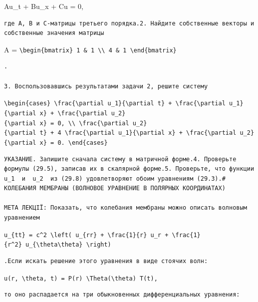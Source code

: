 \documentclass[
  ukrainian,
]{article}
\begin{document}
Au\_t + Bu\_x + Cu = 0,

\begin{verbatim}
где A, B и C-матрицы третьего порядка.2. Найдите собственные векторы и собственные значения матрицы
\end{verbatim}

A =
\texttt{\textbackslash{}begin\{bmatrix\}\ 1\ \&\ 1\ \textbackslash{}\textbackslash{}\ 4\ \&\ 1\ \textbackslash{}end\{bmatrix\}}

\begin{verbatim}
.

3. Воспользовавшись результатами задачи 2, решите систему
\end{verbatim}

\texttt{\textbackslash{}begin\{cases\}\ \textbackslash{}frac\{\textbackslash{}partial\ u\_1\}\{\textbackslash{}partial\ t\}\ +\ \textbackslash{}frac\{\textbackslash{}partial\ u\_1\}\{\textbackslash{}partial\ x\}\ +\ \textbackslash{}frac\{\textbackslash{}partial\ u\_2\}\{\textbackslash{}partial\ x\}\ =\ 0,\ \textbackslash{}\textbackslash{}\ \textbackslash{}frac\{\textbackslash{}partial\ u\_2\}\{\textbackslash{}partial\ t\}\ +\ 4\ \textbackslash{}frac\{\textbackslash{}partial\ u\_1\}\{\textbackslash{}partial\ x\}\ +\ \textbackslash{}frac\{\textbackslash{}partial\ u\_2\}\{\textbackslash{}partial\ x\}\ =\ 0.\ \textbackslash{}end\{cases\}}

\begin{verbatim}
УКАЗАНИЕ. Запишите сначала систему в матричной форме.4. Проверьте формулы (29.5), записав их в скалярной форме.5. Проверьте, что функции  u_1  и  u_2  из (29.8) удовлетворяют обоим уравнениям (29.3).# КОЛЕБАНИЯ МЕМБРАНЫ (ВОЛНОВОЕ УРАВНЕНИЕ В ПОЛЯРНЫХ КООРДИНАТАХ)

МЕТА ЛЕКЦІЇ: Показать, что колебания мембраны можно описать волновым уравнением
\end{verbatim}

\texttt{u\_\{tt\}\ =\ c\^{}2\ \textbackslash{}left(\ u\_\{rr\}\ +\ \textbackslash{}frac\{1\}\{r\}\ u\_r\ +\ \textbackslash{}frac\{1\}\{r\^{}2\}\ u\_\{\textbackslash{}theta\textbackslash{}theta\}\ \textbackslash{}right)}

\begin{verbatim}
.Если искать решение этого уравнения в виде стоячих волн:
\end{verbatim}

\texttt{u(r,\ \textbackslash{}theta,\ t)\ =\ P(r)\ \textbackslash{}Theta(\textbackslash{}theta)\ T(t),}

\begin{verbatim}
то оно распадается на три обыкновенных дифференциальных уравнения:
\end{verbatim}
\end{document}

